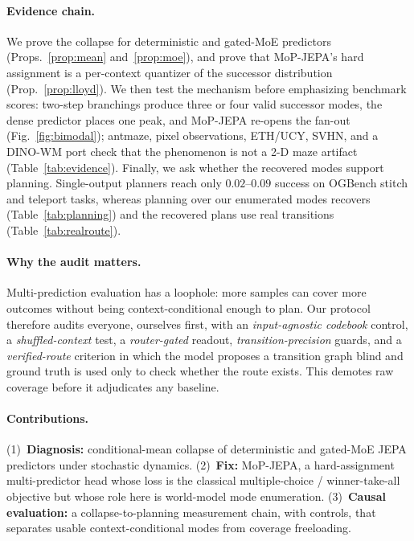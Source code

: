 \documentclass[letterpaper]{article}
\begin{document}
\paragraph{Evidence chain.}
We prove the collapse for deterministic and gated-MoE predictors (Props.~\ref{prop:mean}
and~\ref{prop:moe}), and prove that MoP-JEPA's hard assignment is a per-context quantizer of the
successor distribution (Prop.~\ref{prop:lloyd}). We then test the mechanism before emphasizing benchmark
scores: two-step branchings produce three or four valid successor modes, the dense predictor places one
peak, and MoP-JEPA re-opens the fan-out (Fig.~\ref{fig:bimodal}); antmaze, pixel observations, ETH/UCY,
SVHN, and a DINO-WM port check that the phenomenon is not a 2-D maze artifact
(Table~\ref{tab:evidence}). Finally, we ask whether the recovered modes support planning. Single-output
planners reach only $0.02$--$0.09$ success on OGBench stitch and teleport tasks, whereas planning over our
enumerated modes recovers (Table~\ref{tab:planning}) and the recovered plans use real transitions
(Table~\ref{tab:realroute}).

\paragraph{Why the audit matters.}
Multi-prediction evaluation has a loophole: more samples can cover more outcomes without being
context-conditional enough to plan. Our protocol therefore audits everyone, ourselves first, with an
\emph{input-agnostic codebook} control, a \emph{shuffled-context} test, a \emph{router-gated} readout,
\emph{transition-precision} guards, and a \emph{verified-route} criterion in which the model proposes a
transition graph blind and ground truth is used only to check whether the route exists. This demotes raw
coverage before it adjudicates any baseline.

\paragraph{Contributions.}
(1)~\textbf{Diagnosis:} conditional-mean collapse of deterministic and gated-MoE JEPA predictors under
stochastic dynamics. (2)~\textbf{Fix:} MoP-JEPA, a hard-assignment multi-predictor head whose loss is the
classical multiple-choice / winner-take-all objective \citep{guzman2012multiple,lee2016stochastic} but
whose role here is world-model mode enumeration. (3)~\textbf{Causal evaluation:} a collapse-to-planning
measurement chain, with controls, that separates usable context-conditional modes from coverage
freeloading.
\end{document}
